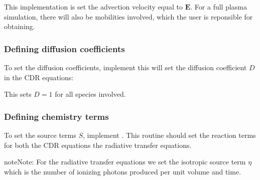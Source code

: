 \documentclass[letterpaper,10pt,english]{sphinxmanual}
\begin{document}
\sphinxAtStartPar
This implementation is set the advection velocity equal to \(\mathbf{E}\).
For a full plasma simulation, there will also be mobilities involved, which the user is reponsible for obtaining.


\subsubsection{Defining diffusion coefficients}
\label{\detokenize{Applications/CdrPlasmaModel:defining-diffusion-coefficients}}
\sphinxAtStartPar
To set the diffusion coefficients, implement  \textendash{} this will set the diffusion coefficient \(D\) in the CDR equations:

\begin{sphinxVerbatim}[commandchars=\\\{\},formatcom=\scriptsize]
           
                                                   
                                                   
                                                 
     
\end{sphinxVerbatim}

\sphinxAtStartPar
This sets \(D = 1\) for all species involved.


\subsubsection{Defining chemistry terms}
\label{\detokenize{Applications/CdrPlasmaModel:defining-chemistry-terms}}
\sphinxAtStartPar
To set the source terms \(S\), implement .
This routine should set the reaction terms for both the CDR equations  the radiative transfer equations.

\begin{sphinxadmonition}{note}{Note:}
\sphinxAtStartPar
For the radiative transfer equations we set the isotropic source term \(\eta\) which is the number of ionizing photons produced per unit volume and time.
\end{sphinxadmonition}
\end{document}
